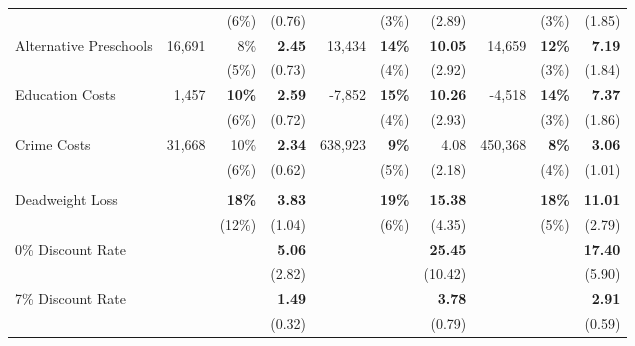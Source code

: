 \documentclass[static]{JJH-Beamer}
\begin{document}
\begin{frame}[shrink=10]
\begin{table}[H]
\begin{center}
\begin{tabular}{l r r r r r r r r r}
	&		&	(6\%)	&	(0.76)	&		&	(3\%)	&	(2.89)	&		&	(3\%)	&	(1.85)	\\
Alternative Preschools	&	16,691	&	8\%	&	\textbf{2.45}	&	13,434	&	\textbf{14\%}	&	\textbf{10.05}	&	14,659	&	\textbf{12\%}	&	\textbf{7.19}	\\
	&		&	(5\%)	&	(0.73)	&		&	(4\%)	&	(2.92)	&		&	(3\%)	&	(1.84)	\\
Education Costs	&	1,457	&	\textbf{10\%}	&	\textbf{2.59}	&	-7,852	&	\textbf{15\%}	&	\textbf{10.26}	&	-4,518	&	\textbf{14\%}	&	\textbf{7.37}	\\
	&		&	(6\%)	&	(0.72)	&		&	(4\%)	&	(2.93)	&		&	(3\%)	&	(1.86)	\\
Crime Costs	&	31,668	&	10\%	&	\textbf{2.34}	&	638,923	&	\textbf{9\%}	&	4.08	&	450,368	&	\textbf{8\%}	&	\textbf{3.06}	\\
	&		&	(6\%)	&	(0.62)	&		&	(5\%)	&	(2.18)	&	&	(4\%)	&	(1.01)	\\ \\
Deadweight Loss	&		&	\textbf{18\%}	&	\textbf{3.83}	&		&	\textbf{19\%}	&	\textbf{15.38}	&		&	\textbf{18\%}	&	\textbf{11.01}	\\
	&		&	(12\%)	&	(1.04)	&		&	(6\%)	&	(4.35)	&		&	(5\%)	&	(2.79)	\\
0\% Discount Rate	&		&		&	\textbf{5.06}	&		&		&	\textbf{25.45}	&		&		&	\textbf{17.40}	\\
	&		&		&	(2.82)	&		&		&	(10.42)	&		&		&	(5.90)	\\
7\% Discount Rate	&		&		&	\textbf{1.49}	&		&		&	\textbf{3.78}	&		&		&	\textbf{2.91}	\\
	&		&		&	(0.32)	&		&		&	(0.79)	&		&		&	(0.59)	\\
\bottomrule																			
\end{tabular}		
\end{center}
\end{table}

\end{frame}
\end{document}
